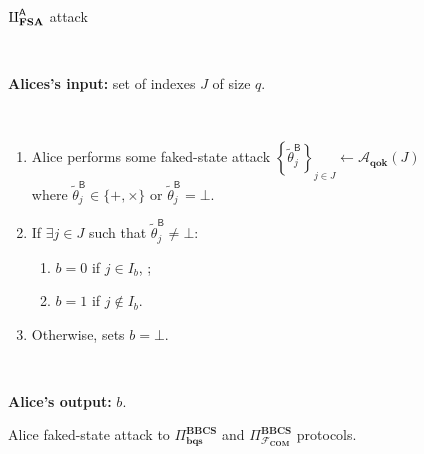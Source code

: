 \begin{figure}[h!]
    \centering
        \begin{tcolorbox}
            
            \centerline{$\rotPi^{\mathsf{A}}_{\textbf{FSA}}$ attack}
            
            \
            
            \textbf{Alices's input:}  set of indexes $J$ of size $q$.
            
            \
 
 	\begin{enumerate}
         \item Alice performs some faked-state attack $\left\{\tilde{\theta}^{\mathsf{B}}_{j}\right\}_{j\in J} \leftarrow \mathcal{A}_{\textbf{qok}}(J) $ where $\tilde{\theta}^{\mathsf{B}}_{j}\in\{+, \times\}$ or $\tilde{\theta}^{\mathsf{B}}_{j}=\bot$. 
         \item If $\exists j\in J$ such that $\tilde{\theta}^{\mathsf{B}}_{j} \neq \bot$:
		\begin{enumerate}
            \item $b=0$ if $j\in I_b$, ;
            \item $b=1$ if $j\notin I_b$.
		\end{enumerate}
		\item Otherwise, sets $b = \bot$.
         
	\end{enumerate}            
            
            \
            
        \textbf{Alice's output:} $b$.

        
        \end{tcolorbox}
    \caption{Alice faked-state attack to $\Pi^{\textbf{BBCS}}_{\textbf{bqs}}$ and $\Pi^{\textbf{BBCS}}_{\mathcal{F}_\textbf{COM}}$ protocols.}
    \label{fig:A_FSA}
\end{figure}

\


